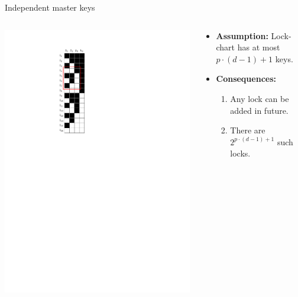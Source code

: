 \begin{frame}{Independent master keys}
  \begin{columns}
    \begin{column}{.2\textwidth}
      \includegraphics[height=0.8\textheight]{IndependentKeysLockChart.pdf}
    \end{column}

    \begin{column}{.8\textwidth}
      \begin{itemize}
        \item \textbf{Assumption:} Lock-chart has at most $p\cdot (d-1) + 1$ keys.
        \item \textbf{Consequences:}
        \begin{enumerate}
          \item Any lock can be added in future.
          \item There are $2^{p\cdot (d-1) + 1}$ such locks.
        \end{enumerate}
      \end{itemize}
    \end{column}
  \end{columns}
\end{frame}






